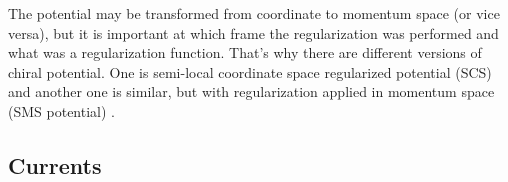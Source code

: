 The potential may be transformed from coordinate to momentum space (or vice versa),
but it is important at which frame the regularization was performed
and what was a regularization function. That's why there are different 
versions of chiral potential. One is semi-local coordinate space regularized potential (SCS) \cite{Epelbaum2014SCS}
and another one is similar, but with regularization applied in momentum space (SMS potential) \cite{reinkrebs2018}.


\subsection*{Currents}
 

